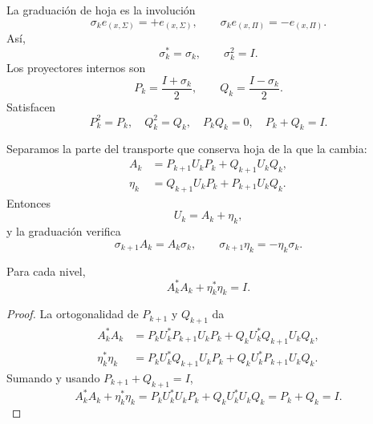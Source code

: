 La graduación de hoja es la involución
\begin{equation}
\label{eq:continuo-sp-sigma}
 \sigma_ke_{(x,\Sigma)}=+e_{(x,\Sigma)},
 \qquad
 \sigma_ke_{(x,\Pi)}=-e_{(x,\Pi)}.
\end{equation}
Así,
\[
 \sigma_k^*=\sigma_k,
 \qquad
 \sigma_k^2=I.
\]
Los proyectores internos son
\begin{equation}
\label{eq:continuo-sp-p-q}
 P_k=\frac{I+\sigma_k}{2},
 \qquad
 Q_k=\frac{I-\sigma_k}{2}.
\end{equation}
Satisfacen
\begin{equation}
\label{eq:continuo-sp-p-q-relaciones}
 P_k^2=P_k,
 \quad Q_k^2=Q_k,
 \quad P_kQ_k=0,
 \quad P_k+Q_k=I.
\end{equation}

Separamos la parte del transporte que conserva hoja de la que la cambia:
\begin{align}
 A_k&=P_{k+1}U_kP_k+Q_{k+1}U_kQ_k,
 \label{eq:continuo-sp-a}\\
 \eta_k&=Q_{k+1}U_kP_k+P_{k+1}U_kQ_k.
 \label{eq:continuo-sp-eta}
\end{align}
Entonces
\begin{equation}
\label{eq:continuo-sp-u-a-eta}
 U_k=A_k+\eta_k,
\end{equation}
y la graduación verifica
\begin{equation}
\label{eq:continuo-sp-paridad-a-eta}
 \sigma_{k+1}A_k=A_k\sigma_k,
 \qquad
 \sigma_{k+1}\eta_k=-\eta_k\sigma_k.
\end{equation}

\begin{proposition}
\label{prop:continuo-sp-balance-local}
Para cada nivel,
\begin{equation}
\label{eq:continuo-sp-balance-local}
 A_k^*A_k+\eta_k^*\eta_k=I.
\end{equation}
\end{proposition}

\begin{proof}
La ortogonalidad de \(P_{k+1}\) y \(Q_{k+1}\) da
\begin{align*}
 A_k^*A_k
 &=P_kU_k^*P_{k+1}U_kP_k
   +Q_kU_k^*Q_{k+1}U_kQ_k,\\
 \eta_k^*\eta_k
 &=P_kU_k^*Q_{k+1}U_kP_k
   +Q_kU_k^*P_{k+1}U_kQ_k.
\end{align*}
Sumando y usando \(P_{k+1}+Q_{k+1}=I\),
\[
 A_k^*A_k+\eta_k^*\eta_k
 =P_kU_k^*U_kP_k+Q_kU_k^*U_kQ_k
 =P_k+Q_k=I.
\]
\end{proof}

